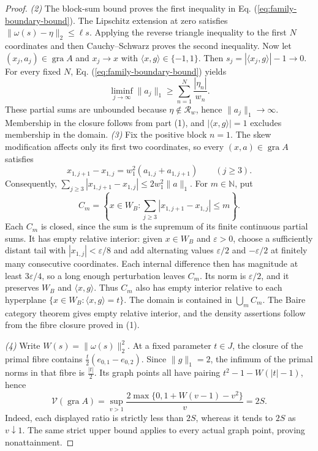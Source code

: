 \documentclass[11pt]{article}
\newcommand{\N}{\mathbb N}
\newcommand{\gra}{\operatorname{gra}}
\newcommand{\pair}[2]{\langle #1,#2\rangle}
\theoremstyle{definition}
\theoremstyle{remark}
\begin{document}
\begin{proof}
\noindent\textit{(2)} The block-sum bound proves the first inequality in Eq. (\ref{eq:family-boundary-bound}). The Lipschitz extension at zero satisfies $\|\omega(s)-\eta\|_2\le\ell s$. Applying the reverse triangle inequality to the first $N$ coordinates and then Cauchy--Schwarz proves the second inequality. Now let $(x_j,a_j)\in\gra A$ and $x_j\to x$ with $\pair{x}{g}\in\{-1,1\}$. Then $s_j=|\pair{x_j}{g}|-1\to0$. For every fixed $N$, Eq. (\ref{eq:family-boundary-bound}) yields
\[
\liminf_{j\to\infty}\|a_j\|_1\ge\sum_{n=1}^N\frac{|\eta_n|}{w_n}.
\]
These partial sums are unbounded because $\eta\notin\mathcal R_w$, hence $\|a_j\|_1\to\infty$. Membership in the closure follows from part (1), and $|\pair{x}{g}|=1$ excludes membership in the domain.
\noindent\textit{(3)} Fix the positive block $n=1$. The skew modification affects only its first two coordinates, so every $(x,a)\in\gra A$ satisfies
\[
x_{1,j+1}-x_{1,j}=w_1^2(a_{1,j}+a_{1,j+1})\qquad(j\ge3).
\]
Consequently, $\sum_{j\ge3}|x_{1,j+1}-x_{1,j}|\le2w_1^2\|a\|_1$. For $m\in\N$, put
\[
C_m=\left\{x\in W_B:\sum_{j\ge3}|x_{1,j+1}-x_{1,j}|\le m\right\}.
\]
Each $C_m$ is closed, since the sum is the supremum of its finite continuous partial sums. It has empty relative interior: given $x\in W_B$ and $\varepsilon>0$, choose a sufficiently distant tail with $|x_{1,j}|<\varepsilon/8$ and add alternating values $\varepsilon/2$ and $-\varepsilon/2$ at finitely many consecutive coordinates. Each internal difference then has magnitude at least $3\varepsilon/4$, so a long enough perturbation leaves $C_m$. Its norm is $\varepsilon/2$, and it preserves $W_B$ and $\pair{x}{g}$. Thus $C_m$ also has empty interior relative to each hyperplane $\{x\in W_B:\pair{x}{g}=t\}$. The domain is contained in $\bigcup_m C_m$. The Baire category theorem gives empty relative interior, and the density assertions follow from the fibre closure proved in (1).

\noindent\textit{(4)} Write $W(s)=\|\omega(s)\|_2^2$. At a fixed parameter $t\in J$, the closure of the primal fibre contains $\frac{t}{2}(e_{0,1}-e_{0,2})$. Since $\|g\|_1=2$, the infimum of the primal norms in that fibre is $\frac{|t|}{2}$. Its graph points all have pairing $t^2-1-W(|t|-1)$, hence
\[
\mathcal V(\gra A)
=\sup_{v>1}\frac{2\max\{0,1+W(v-1)-v^2\}}{v}
=2S.
\]
Indeed, each displayed ratio is strictly less than $2S$, whereas it tends to $2S$ as $v\downarrow1$. The same strict upper bound applies to every actual graph point, proving nonattainment.
\end{proof}
\end{document}
